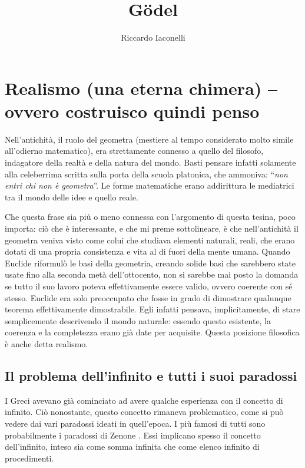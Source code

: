 \documentclass[a4paper,10pt]{article}
\title{Gödel}
\author{Riccardo Iaconelli}
\begin{document}
\maketitle

\cleardoublepage
\tableofcontents
\cleardoublepage
\section[Realismo (un'eterna chimera)]{Realismo (una eterna chimera) -- ovvero costruisco quindi penso}
Nell'antichità, il ruolo del geometra (mestiere al tempo considerato molto simile all'odierno matematico), era strettamente connesso a quello del filosofo, indagatore della realtà e della natura del mondo. Basti pensare infatti solamente alla celeberrima scritta sulla porta della scuola platonica, che ammoniva: “\textit{non entri chi non è geometra}”. Le forme matematiche erano addirittura le mediatrici tra il mondo delle idee e quello reale.

Che questa frase sia più o meno connessa con l'argomento di questa tesina, poco importa: ciò che è interessante, e che mi preme sottolineare, è che nell'antichità il geometra veniva visto come colui che studiava elementi naturali, reali, che erano dotati di una propria consistenza e vita al di fuori della mente umana.
Quando Euclide riformulò le basi della geometria, creando solide basi che sarebbero state usate fino alla seconda metà dell'ottocento, non si sarebbe mai posto la domanda se tutto il suo lavoro poteva effettivamente essere valido, ovvero coerente con sé stesso. Euclide era solo preoccupato che fosse in grado di dimostrare qualunque teorema effettivamente dimostrabile. Egli infatti pensava, implicitamente, di stare semplicemente descrivendo il mondo naturale: essendo questo esistente, la coerenza e la completezza erano già date per acquisite. Questa posizione filosofica è anche detta realismo.

\subsection{Il problema dell'infinito e tutti i suoi paradossi}

I Greci avevano già cominciato ad avere qualche esperienza con il concetto di infinito. Ciò nonostante, questo concetto rimaneva problematico, come si può vedere dai vari paradossi ideati in quell'epoca. I più famosi di tutti sono probabilmente i paradossi di Zenone
\cite{wp-paradossi-di-zenone}. Essi implicano spesso il concetto dell'infinito, inteso sia come somma infinita che come elenco infinito di procedimenti.
\end{document}
